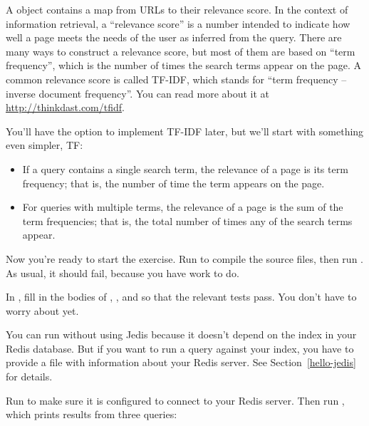 \documentclass[12pt]{book}
\theoremstyle{exercise}
\begin{document}
A  object contains a map from URLs to their relevance
score. In the context of information retrieval, a ``relevance score'' is
a number intended to indicate how well a page meets the needs of the
user as inferred from the query. There are many ways to construct a
relevance score, but most of them are based on ``term frequency'', which
is the number of times the search terms appear on the page. A common
relevance score is called TF-IDF, which stands for ``term frequency --
inverse document frequency''.  You can read more about it at
\url{http://thinkdast.com/tfidf}.


You'll have the option to implement TF-IDF later, but we'll start with
something even simpler, TF:

\begin{itemize}

\item
  If a query contains a single search term, the relevance of a page is
  its term frequency; that is, the number of time the term appears on
  the page.

\item
  For queries with multiple terms, the relevance of a page is the sum of
  the term frequencies; that is, the total number of times any of the
  search terms appear.

\end{itemize}

Now you're ready to start the exercise.
Run  to compile the source files, then run
. As usual, it should
fail, because you have work to do.


In , fill in the bodies of ,
, and  so that the relevant tests pass. You
don't have to worry about  yet.


You can run  without using Jedis because it
doesn't depend on the index in your Redis database. But if you want to
run a query against your index, you have to provide a file with
information about your Redis server.  See Section~\ref{hello-jedis}
for details.


Run  to make sure it is configured to connect to
your Redis server. Then run , which prints results
from three queries:
\end{document}
